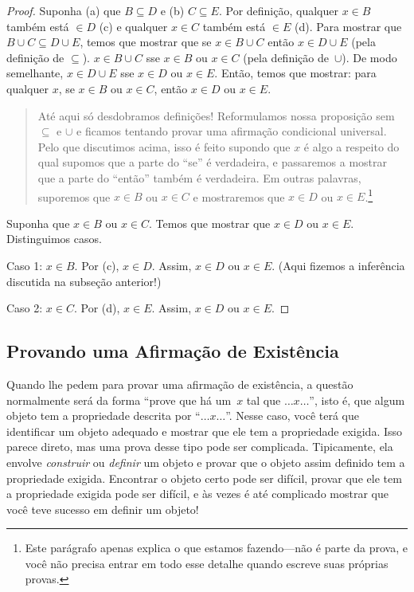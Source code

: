 \documentclass[../../../include/open-logic-section]{subfiles}
\begin{document}
\begin{proof}
  Suponha (a) que $B \subseteq D$ e (b) $C \subseteq E$. Por
  definição, qualquer $x \in B$ também está $\in D$ (c) e qualquer $x \in C$ também
  está $\in E$ (d).  Para mostrar que $B \cup C \subseteq D \cup E$,
  temos que mostrar que se $x \in B \cup C$ então $x \in D \cup E$ (pela
  definição de $\subseteq$). $x \in B \cup C$ sse $x \in B$ ou $x \in
  C$ (pela definição de~$\cup$). De modo semelhante, $x \in D \cup E$ sse $x \in
  D$ ou $x \in E$. Então, temos que mostrar: para qualquer $x$, se $x \in B$ ou
  $x \in C$, então $x \in D$ ou $x \in E$.

  \begin{quote}
  Até aqui só desdobramos definições!{} Reformulamos nossa
  proposição sem $\subseteq$ e $\cup$ e ficamos tentando
  provar uma afirmação condicional universal. Pelo que discutimos
  acima, isso é feito supondo que $x$ é algo a respeito do qual
  supomos que a parte do ``se'' é verdadeira, e passaremos a mostrar que a
  parte do ``então'' também é verdadeira. Em outras palavras, suporemos que $x
  \in B$ ou $x \in C$ e mostraremos que $x \in D$ ou $x \in
  E$.\footnote{Este parágrafo apenas explica o que estamos fazendo---não
    é parte da prova, e você não precisa entrar em todo esse
    detalhe quando escreve suas próprias provas.}
  \end{quote}

  Suponha que $x \in B$ ou $x \in C$. Temos que mostrar que $x \in D$
  ou $x \in E$. Distinguimos casos.

  Caso 1: $x \in B$. Por (c), $x \in D$. Assim, $x \in D$ ou $x \in
  E$. (Aqui fizemos a inferência discutida na subseção
  anterior!)
      
  Caso 2: $x \in C$. Por (d), $x \in E$. Assim, $x \in D$ ou $x \in E$.
 \end{proof}


\subsection{Provando uma Afirmação de Existência}

Quando lhe pedem para provar uma afirmação de existência, a questão normalmente será
da forma ``prove que há um~$x$ tal que $\dots x \dots$'',
isto é, que algum objeto tem a propriedade descrita por ``$\dots x
\dots$''. Nesse caso, você terá que identificar um objeto adequado e mostrar
que ele tem a propriedade exigida.  Isso parece direto, mas uma
prova desse tipo pode ser complicada. Tipicamente, ela envolve
\emph{construir} ou \emph{definir} um objeto e provar que o
objeto assim definido tem a propriedade exigida. Encontrar o objeto certo
pode ser difícil, provar que ele tem a propriedade exigida pode ser difícil,
e às vezes é até complicado mostrar que você teve sucesso em
definir um objeto!{}
\end{document}
